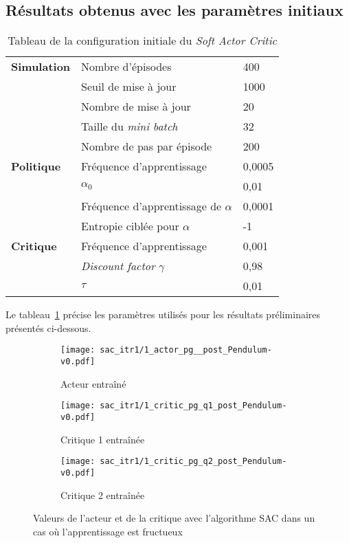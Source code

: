 \subsection{Résultats obtenus avec les paramètres initiaux}

\begin{table}[H]
        \centering
        \begin{tabular}{@{}l l l@{}}
            \toprule
            \textbf{Simulation} & Nombre d'épisodes & 400 \\
            & Seuil de mise à jour & 1000 \\
            & Nombre de mise à jour & 20 \\
            & Taille du \emph{mini batch} & 32 \\
            & Nombre de pas par épisode & 200 \\ \midrule
            \textbf{Politique} & Fréquence d'apprentissage & 0,0005\\
            & \(\alpha_{0}\) & 0,01\\
            & Fréquence d'apprentissage de \(\alpha\) & 0,0001\\
            & Entropie ciblée pour \(\alpha\) & -1\\ \midrule
            \textbf{Critique} & Fréquence d'apprentissage & 0,001\\
            & \emph{Discount factor} \(\gamma\) & 0,98\\
            & \(\tau\) & 0,01\\
            \bottomrule
        \end{tabular}
    \caption{Tableau de la configuration initiale du \emph{Soft Actor Critic}}\label{tab:sac:initial_settings}
\end{table}

Le tableau~\ref{tab:sac:initial_settings} précise les paramètres utilisés pour
les résultats préliminaires présentés ci-dessous.

\begin{figure}[H]
    \centering
    \begin{subfigure}{0.3\textwidth}
        \texttt{[image: sac\_itr1/1\_actor\_pg\_\_post\_Pendulum-v0.pdf]}
        \caption{Acteur entraîné}
    \end{subfigure}
    \begin{subfigure}{0.3\textwidth}
        \texttt{[image: sac\_itr1/1\_critic\_pg\_q1\_post\_Pendulum-v0.pdf]}
        \caption{Critique 1 entraînée}
    \end{subfigure}
    \begin{subfigure}{0.3\textwidth}
        \texttt{[image: sac\_itr1/1\_critic\_pg\_q2\_post\_Pendulum-v0.pdf]}
        \caption{Critique 2 entraînée}
    \end{subfigure}
    \caption{Valeurs de l'acteur et de la critique avec l'algorithme SAC dans un cas où l'apprentissage est fructueux}\label{fig:sac:preli_success}
\end{figure}

